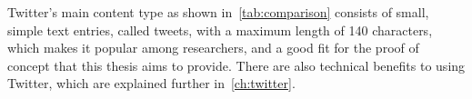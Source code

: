 Twitter's main content type as shown in~\ref{tab:comparison} consists of small, simple text entries, called tweets, with a maximum length of 140 characters,
which makes it popular among researchers, and a good fit for the proof of concept that this thesis aims to provide.
There are also technical benefits to using Twitter, which are explained further in~\ref{ch:twitter}.